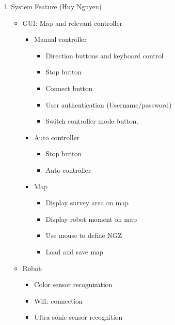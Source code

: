 \documentclass[11pt, a4paper]{article}
\begin{document}
\begin{enumerate}
		\item  System Feature (Huy Nguyen)
		\begin{itemize}
			\item GUI: Map and relevant controller
			\begin{itemize}
				\item Manual controller
				\begin{itemize}
					\item Direction buttons and keyboard control
					\item Stop button
					\item Connect button
					\item User authentication (Username/password)
					\item Switch controller mode button.
				\end{itemize}
				\item Auto controller
				\begin{itemize}
					\item Stop button
					\item Auto controller
				\end{itemize}
				\item Map
				\begin{itemize}
					\item Display survey area on map
					\item Display robot moment on map
					\item Use mouse to define NGZ
					\item Load and save map
				\end{itemize}
			\end{itemize}
			\item Robot:
			\begin{itemize}
				\item Color sensor recognization
				\item Wifi: connection
				\item Ultra sonic sensor recognition
			\end{itemize}
		\end{itemize}
	

\end{enumerate}
\end{document}
